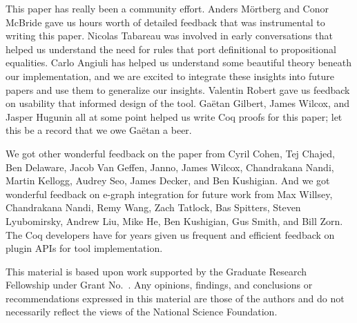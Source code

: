 \documentclass[sigplan,screen]{acmart}
\begin{document}










\begin{acks}                            %
This paper has really been a community effort.
Anders M\"ortberg and Conor McBride gave us hours worth of detailed feedback that was instrumental to writing this paper.
Nicolas Tabareau was involved in early conversations that helped us understand the need for rules that port definitional to propositional equalities.
Carlo Angiuli has helped us understand some beautiful theory beneath our implementation, and we are excited to integrate these insights into future papers
and use them to generalize our insights.
Valentin Robert gave us feedback on usability that informed design of the tool.
Ga\"{e}tan Gilbert, James Wilcox, and Jasper Hugunin all at some point helped us write Coq proofs for this paper;
let this be a record that we owe Ga\"{e}tan a beer.

We got other wonderful feedback on the paper from 
Cyril Cohen, Tej Chajed, Ben Delaware, Jacob Van Geffen, Janno, James Wilcox, Chandrakana Nandi, 
Martin Kellogg, Audrey Seo, James Decker,
and Ben Kushigian.
And we got wonderful feedback on e-graph integration for future work from 
Max Willsey, Chandrakana Nandi, Remy Wang, Zach Tatlock, Bas Spitters, Steven Lyubomirsky, Andrew Liu, Mike He, Ben Kushigian, 
Gus Smith, and Bill Zorn.
The Coq developers have for years given us frequent and efficient feedback on plugin APIs for tool implementation.

This material is based upon work supported by the  Graduate Research Fellowship under Grant No.~. Any opinions, findings, and conclusions or recommendations expressed in this material are those of the authors and do not necessarily reflect the views of the National Science Foundation. %
\end{acks}






\end{document}
